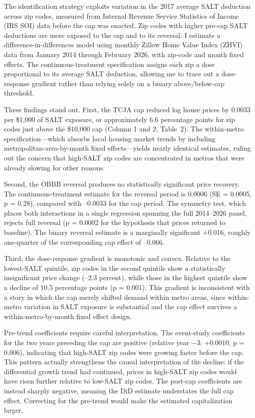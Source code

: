 \documentclass[12pt]{article}
\begin{document}
The identification strategy exploits variation in the 2017 average SALT deduction across zip codes, measured from Internal Revenue Service Statistics of Income (IRS SOI) data before the cap was enacted. Zip codes with higher pre-cap SALT deductions are more exposed to the cap and to its reversal. I estimate a difference-in-differences model using monthly Zillow Home Value Index (ZHVI) data from January 2014 through February 2026, with zip-code and month fixed effects. The continuous-treatment specification assigns each zip a dose proportional to its average SALT deduction, allowing me to trace out a dose-response gradient rather than relying solely on a binary above/below-cap threshold.

Three findings stand out. First, the TCJA cap reduced log house prices by 0.0033 per \$1,000 of SALT exposure, or approximately 6.6 percentage points for zip codes just above the \$10,000 cap (Column 1 and 2, Table~2). The within-metro specification---which absorbs local housing market trends by including metropolitan-area-by-month fixed effects---yields nearly identical estimates, ruling out the concern that high-SALT zip codes are concentrated in metros that were already slowing for other reasons.

Second, the OBBB reversal produces no statistically significant price recovery. The continuous-treatment estimate for the reversal period is 0.0006 (SE = 0.0005, p = 0.28), compared with --0.0033 for the cap period. The symmetry test, which places both interactions in a single regression spanning the full 2014--2026 panel, rejects full reversal (p = 0.0002 for the hypothesis that prices returned to baseline). The binary reversal estimate is a marginally significant +0.016, roughly one-quarter of the corresponding cap effect of --0.066.

Third, the dose-response gradient is monotonic and convex. Relative to the lowest-SALT quintile, zip codes in the second quintile show a statistically insignificant price change (--2.3 percent), while those in the highest quintile show a decline of 10.5 percentage points (p = 0.001). This gradient is inconsistent with a story in which the cap merely shifted demand within metro areas, since within-metro variation in SALT exposure is substantial and the cap effect survives a within-metro-by-month fixed effect design.

Pre-trend coefficients require careful interpretation. The event-study coefficients for the two years preceding the cap are positive (relative year $-3$: +0.0010, p = 0.006), indicating that high-SALT zip codes were growing faster before the cap. This pattern actually strengthens the causal interpretation of the decline: if the differential growth trend had continued, prices in high-SALT zip codes would have risen further relative to low-SALT zip codes. The post-cap coefficients are instead sharply negative, meaning the DiD estimate understates the full cap effect. Correcting for the pre-trend would make the estimated capitalization larger.
\end{document}
